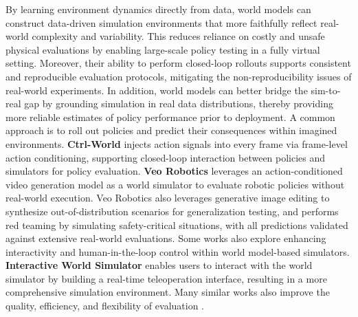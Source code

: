 By learning environment dynamics directly from data, world models can construct data-driven simulation environments that more faithfully reflect real-world complexity and variability. This reduces reliance on costly and unsafe physical evaluations by enabling large-scale policy testing in a fully virtual setting. Moreover, their ability to perform closed-loop rollouts supports consistent and reproducible evaluation protocols, mitigating the non-reproducibility issues of real-world experiments. In addition, world models can better bridge the sim-to-real gap by grounding simulation in real data distributions, thereby providing more reliable estimates of policy performance prior to deployment. A common approach is to roll out policies and predict their consequences within imagined environments. \textbf{Ctrl-World} \cite{Ctrl-World} injects action signals into every frame via frame-level action conditioning, supporting closed-loop interaction between policies and simulators for policy evaluation. \textbf{Veo Robotics} \cite{geminiroboticsteam} leverages an action-conditioned video generation model as a world simulator to evaluate robotic policies without real-world execution. Veo Robotics also leverages generative image editing to synthesize out-of-distribution scenarios for generalization testing, and performs red teaming by simulating safety-critical situations, with all predictions validated against extensive real-world evaluations. Some works also explore enhancing interactivity and human-in-the-loop control within world model-based simulators. \textbf{Interactive World Simulator} \cite{InteractiveWorldSimulator} enables users to interact with the world simulator by building a real-time teleoperation interface, resulting in a more comprehensive simulation environment. Many similar works also improve the quality, efficiency, and flexibility of evaluation \cite{WorldEval, WorldGym, li2026dworldevalscalableroboticpolicy}.


